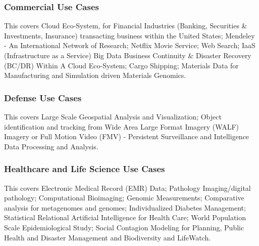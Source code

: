 

\subsubsection{Commercial Use Cases}\label{commercial-use-cases}

This covers Cloud Eco-System, for Financial Industries (Banking,
Securities \& Investments, Insurance) transacting business within the
United States; Mendeley - An International Network of Research; Netflix
Movie Service; Web Search; IaaS (Infrastructure as a Service) Big Data
Business Continuity \& Disaster Recovery (BC/DR) Within A Cloud
Eco-System; Cargo Shipping; Materials Data for Manufacturing and
Simulation driven Materials Genomics.




\subsubsection{Defense Use Cases}\label{defense-use-cases}

This covers Large Scale Geospatial Analysis and Visualization; Object
identification and tracking from Wide Area Large Format Imagery (WALF)
Imagery or Full Motion Video (FMV) - Persistent Surveillance and
Intelligence Data Processing and Analysis.




\subsubsection{Healthcare and Life Science Use
Cases}\label{healthcare-and-life-science-use-cases}

This covers Electronic Medical Record (EMR) Data; Pathology
Imaging/digital pathology; Computational Bioimaging; Genomic
Measurements; Comparative analysis for metagenomes and genomes;
Individualized Diabetes Management; Statistical Relational Artificial
Intelligence for Health Care; World Population Scale Epidemiological
Study; Social Contagion Modeling for Planning, Public Health and
Disaster Management and Biodiversity and LifeWatch.





